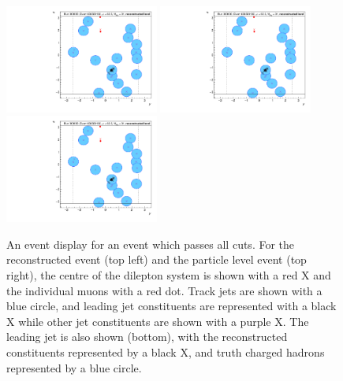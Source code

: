 \begin{figure}[h!]
  \centering
  \includegraphics[page=6,width=0.45\textwidth]{figures/EventDisplays.pdf}
  \includegraphics[page=7,width=0.45\textwidth]{figures/EventDisplays.pdf} \\
  \includegraphics[page=8,width=0.45\textwidth]{figures/EventDisplays.pdf}
  \caption{An event display for an event which passes all cuts. For the reconstructed event (top left) and the particle level event (top right), the centre of the dilepton system is shown with a red X and the individual muons with a red dot.
  Track jets are shown with a blue circle, and leading jet constituents are represented with a black X while other jet constituents are shown with a purple X. The leading jet is also shown (bottom), with the reconstructed constituents represented
  by a black X, and truth charged hadrons represented by a blue circle.}
  \label{fig:EventDisplay}
\end{figure}

\clearpage
